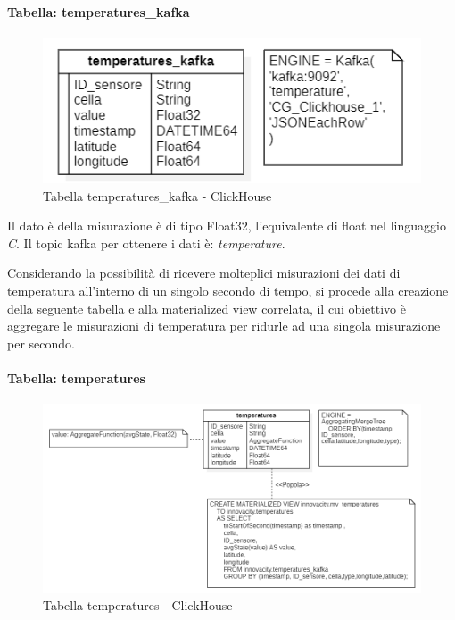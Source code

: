 \paragraph{Tabella: temperatures\_kafka}
\begin{figure}[H]
    \centering
    \includegraphics[width=1\textwidth]{../Images/SpecificaTecnica/temperatures_kafka.PNG}
    \caption{Tabella temperatures\_kafka - ClickHouse}
    \label{fig:temperaturesKafka}
  \end{figure}

Il dato è della misurazione è di tipo Float32, l'equivalente di float nel linguaggio \textit{C}.
Il topic kafka per ottenere i dati è: \textit{temperature}.

Considerando la possibilità di ricevere molteplici misurazioni dei dati di temperatura all'interno di un singolo secondo di tempo, si procede alla creazione della seguente tabella e alla materialized view correlata, il cui obiettivo è aggregare le misurazioni di temperatura per ridurle ad una singola misurazione per secondo.

\paragraph{Tabella: temperatures}
\begin{figure}[H]
    \centering
    \includegraphics[width=1\textwidth]{../Images/SpecificaTecnica/temperatures.PNG}
    \caption{Tabella temperatures - ClickHouse}
    \label{fig:temperatures}
  \end{figure}

